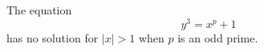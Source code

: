 \begin{proposition}\label{eq:170}
    The equation
\[
    y^3=x^p+1
\]
    has no solution for $|x|>1$ when $p$ is an odd prime.
\end{proposition}
